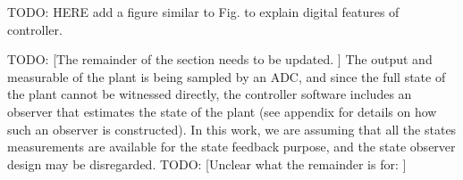 \documentclass[runningheads,a4paper]{llncs}
\newcommand{\todo}[1]{{\color{red} TODO: #1}}
\newcommand{\commentib}[1]{{\color{blue} [IB: #1]}}
\newcommand{\mat}[1]{\boldsymbol{#1}}
\begin{document}

\todo{HERE add a figure similar to Fig. \label{fig:observersystem} to explain digital features of controller.} 

\todo{[The remainder of the section needs to be updated. ]}
The output and measurable of the plant is being sampled by an ADC, and since the full state of the
plant cannot be witnessed directly, the controller software includes an observer that 
estimates the state of the plant (see appendix for details on how such an observer
is constructed). In this work, we are assuming that all the states measurements are available for the state feedback purpose, and the state observer design may be disregarded.  
\todo{[Unclear what the remainder is for: ]}
\end{document}
